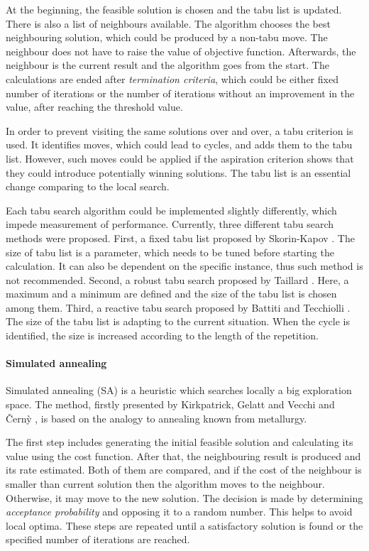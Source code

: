 At the beginning, the feasible solution is chosen and the tabu list is updated.
There is also a list of neighbours available.
The algorithm chooses the best neighbouring solution, which could be produced by a non-tabu move.
The neighbour does not have to raise the value of objective function.
Afterwards, the neighbour is the current result and the algorithm goes from the start.
The calculations are ended after \textit{termination criteria}, which could be either fixed number of iterations or the number of iterations without an improvement in the value, after reaching the threshold value.

In order to prevent visiting the same solutions over and over, a tabu criterion is used.
It identifies moves, which could lead to cycles, and adds them to the tabu list.
However, such moves could be applied if the aspiration criterion shows that they could introduce potentially winning solutions.
The tabu list is an essential change comparing to the local search.

Each tabu search algorithm could be implemented slightly differently, which impede measurement of performance.
Currently, three different tabu search methods were proposed.
First, a fixed tabu list proposed by Skorin-Kapov \cite{skorin1990tabu}.
The size of tabu list is a parameter, which needs to be tuned before starting the calculation.
It can also be dependent on the specific instance, thus such method is not recommended.
Second, a robust tabu search proposed by Taillard \cite{taillard1991robust}.
Here, a maximum and a minimum are defined and the size of the tabu list is chosen among them.
Third, a reactive tabu search proposed by Battiti and Tecchiolli \cite{battiti1994reactive}.
The size of the tabu list is adapting to the current situation.
When the cycle is identified, the size is increased according to the length of the repetition.

\paragraph{Simulated annealing}

Simulated annealing (SA) is a heuristic which searches locally a big exploration space.
The method, firstly presented by Kirkpatrick, Gelatt and Vecchi \cite{kirkpatrick1983optimization} and {\v{C}}ern{\`y} \cite{vcerny1985thermodynamical}, is based on the analogy to annealing known from metallurgy.

The first step includes generating the initial feasible solution and calculating its value using the cost function.
After that, the neighbouring result is produced and its rate estimated.
Both of them are compared, and if the cost of the neighbour is smaller than current solution then the algorithm moves to the neighbour.
Otherwise, it may move to the new solution.
The decision is made by determining \textit{acceptance probability} and opposing it to a random number.
This helps to avoid local optima.
These steps are repeated until a satisfactory solution is found or the specified number of iterations are reached.

